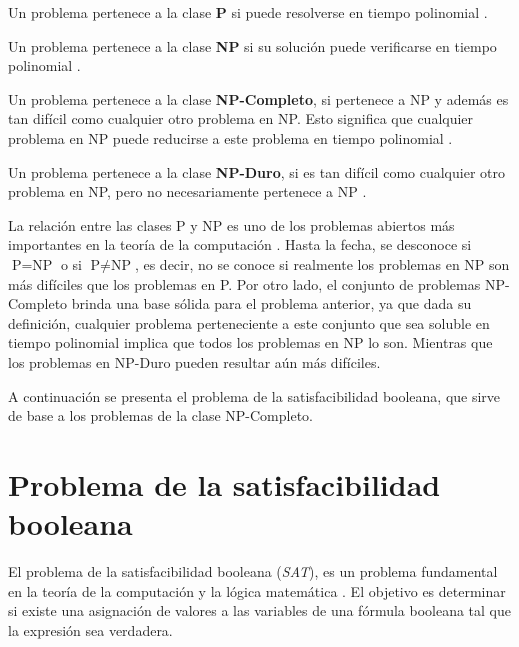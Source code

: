 \begin{definition}
  Un problema pertenece a la clase \textbf{P} si puede resolverse en tiempo polinomial \cite{authomataTheory}.
\end{definition}

\begin{definition}
  Un problema pertenece a la clase \textbf{NP} si su solución puede verificarse en tiempo polinomial \cite{authomataTheory}.
\end{definition}

\begin{definition}
  Un problema pertenece a la clase \textbf{NP-Completo}, si pertenece a NP y además es tan difícil como cualquier otro problema en NP. Esto significa que cualquier problema en NP puede reducirse a este problema en tiempo polinomial \cite{authomataTheory}.
\end{definition}

\begin{definition}
  Un problema pertenece a la clase \textbf{NP-Duro}, si es tan difícil como cualquier otro problema en NP, pero no necesariamente pertenece a NP \cite{authomataTheory}. 
\end{definition}

La relación entre las clases P y NP es uno de los problemas abiertos más importantes en la teoría de la computación 
\cite{authomataTheory}. Hasta la fecha, se desconoce si $\text{P} = \text{NP}$ o si $\text{P} \neq \text{NP}$, es decir, 
no se conoce si realmente los problemas en NP son más difíciles que los problemas en P. Por otro lado, el conjunto de 
problemas NP-Completo brinda una base sólida para el problema anterior, ya que dada su definición, cualquier problema 
perteneciente a este conjunto que sea soluble en tiempo polinomial implica que todos los problemas en NP lo son. 
Mientras que los problemas en NP-Duro pueden resultar aún más difíciles. 

A continuación se presenta el problema de la satisfacibilidad booleana, que sirve de base a los problemas de la clase NP-Completo.

\section{Problema de la satisfacibilidad booleana}

El problema de la satisfacibilidad booleana (\textit{SAT}), es un problema fundamental en la teoría de la computación y la lógica matemática \cite{authomataTheory}. El objetivo es determinar si existe una asignación de valores a las variables de una fórmula booleana tal que la expresión sea verdadera.

